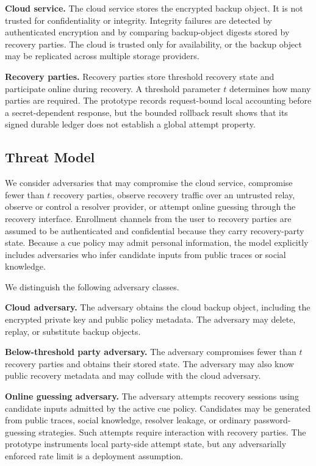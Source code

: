 \documentclass[sigconf,anonymous]{acmart}
\begin{document}
\textbf{Cloud service.}
The cloud service stores the encrypted backup object. It is not trusted for confidentiality or integrity. Integrity failures are detected by authenticated encryption and by comparing backup-object digests stored by recovery parties. The cloud is trusted only for availability, or the backup object may be replicated across multiple storage providers.

\textbf{Recovery parties.}
Recovery parties store threshold recovery state and participate online during recovery. A threshold parameter \(t\) determines how many parties are required. The prototype records request-bound local accounting before a secret-dependent response, but the bounded rollback result shows that its signed durable ledger does not establish a global attempt property.

\subsection{Threat Model}

We consider adversaries that may compromise the cloud service, compromise fewer than \(t\) recovery parties, observe recovery traffic over an untrusted relay, observe or control a resolver provider, or attempt online guessing through the recovery interface. Enrollment channels from the user to recovery parties are assumed to be authenticated and confidential because they carry recovery-party state. Because a cue policy may admit personal information, the model explicitly includes adversaries who infer candidate inputs from public traces or social knowledge.

We distinguish the following adversary classes.

\textbf{Cloud adversary.}
The adversary obtains the cloud backup object, including the encrypted private key and public policy metadata. The adversary may delete, replay, or substitute backup objects.

\textbf{Below-threshold party adversary.}
The adversary compromises fewer than \(t\) recovery parties and obtains their stored state. The adversary may also know public recovery metadata and may collude with the cloud adversary.

\textbf{Online guessing adversary.}
The adversary attempts recovery sessions using candidate inputs admitted by the active cue policy. Candidates may be generated from public traces, social knowledge, resolver leakage, or ordinary password-guessing strategies. Such attempts require interaction with recovery parties. The prototype instruments local party-side attempt state, but any adversarially enforced rate limit is a deployment assumption.
\end{document}
